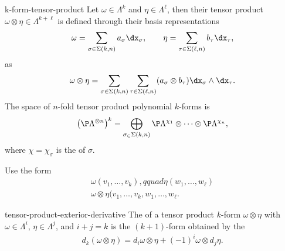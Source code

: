 \begin{Definition}{k-form-tensor-product}
  Let $\omega\in \Lambda^k$ and $\eta\in\Lambda^\ell$, then their
  tensor product $\omega\otimes\eta\in\Lambda^{k+\ell}$ is defined through
  their basis representations
  \begin{gather}
    \omega = \sum_{\sigma\in\Sigma(k,n)} a_\sigma \dx_\sigma,
    \qquad
    \eta = \sum_{\tau\in\Sigma(\ell,n)} b_\tau \dx_\tau,
  \end{gather}
  as
  \begin{gather}
    \omega\otimes\eta = \sum_{\sigma\in\Sigma(k,n)}\sum_{\tau\in\Sigma(\ell,n)}
    (a_\sigma\otimes b_\tau) \dx_\sigma \wedge \dx_\tau.
  \end{gather}
  The space of $n$-fold tensor product polynomial $k$-forms is
  \begin{gather}
    \left(\P\Lambda^{\otimes n}\right)^k
    = \bigoplus_{\sigma_\in\Sigma(k,n)}
    \P\Lambda^{\chi_1} \otimes \dots \otimes \P\Lambda^{\chi_n},
  \end{gather}
  where $\chi= \chi_\sigma$ is the  of $\sigma$.
\end{Definition}

\begin{todo}
  Use the form
  \begin{gather}
    \omega(v_1,\dots,v_k), qquad \eta(w_1,\dots,w_\ell)\\
    \omega\otimes \eta(v_1,\dots,v_k,w_1,\dots,w_\ell.
  \end{gather}
\end{todo}

\begin{Lemma}{tensor-product-exterior-derivative}
  The  of a tensor product $k$-form
  $\omega\otimes\eta$ with $\omega\in\Lambda^i$,
  $\eta\in\Lambda^j$, and $i+j=k$ is the $(k+1)$-form obtained by the
  \begin{gather}
    d_k(\omega\otimes\eta) = d_i\omega \otimes \eta +  (-1)^i \omega \otimes d_j\eta.
  \end{gather}
\end{Lemma}

